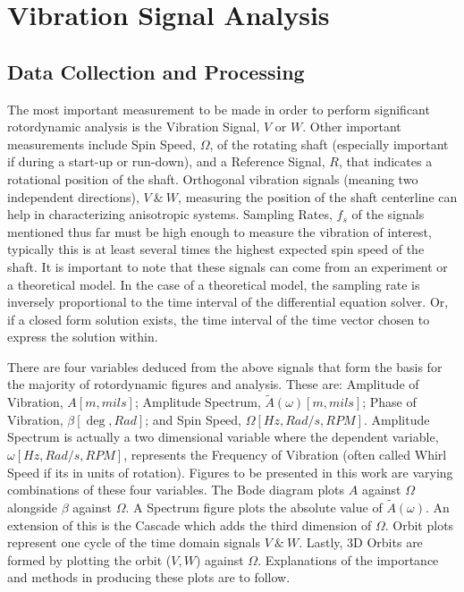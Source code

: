 \chapter{Vibration Signal Analysis}\label{VibrationSignalAnalysis}
\section{Data Collection and Processing}
The most important measurement to be made in order to perform significant rotordynamic analysis is the Vibration Signal, $ V $ or $ W $. Other important measurements include Spin Speed, $ \Omega $, of the rotating shaft (especially important if during a start-up or run-down), and a Reference Signal, $ R $, that indicates a rotational position of the shaft. Orthogonal vibration signals (meaning two independent directions), $ V\ \&\ W $, measuring the position of the shaft centerline can help in characterizing anisotropic systems. Sampling Rates, $ f_s $ of the signals mentioned thus far must be high enough to measure the vibration of interest, typically this is at least several times the highest expected spin speed of the shaft. It is important to note that these signals can come from an experiment or a theoretical model. In the case of a theoretical model, the sampling rate is inversely proportional to the time interval of the differential equation solver. Or, if a closed form solution exists, the time interval of the time vector chosen to express the solution within.\par
There are four variables deduced from the above signals that form the basis for the majority of rotordynamic figures and analysis. These are: Amplitude of Vibration, $ A[m,mils] $; Amplitude Spectrum, $ \tilde{A}(\omega)[m,mils] $; Phase of Vibration, $ \beta[\deg,Rad] $; and Spin Speed, $ \Omega[Hz,Rad/s,RPM] $. Amplitude Spectrum is actually a two dimensional variable where the dependent variable, $ \omega[Hz,Rad/s,RPM] $, represents the Frequency of Vibration (often called Whirl Speed if its in units of rotation). Figures to be presented in this work are varying combinations of these four variables. The Bode diagram plots $ A $ against $ \Omega $ alongside $ \beta $  against $ \Omega $. A Spectrum figure plots the absolute value of $ \tilde{A}(\omega) $. An extension of this is the Cascade which adds the third dimension of $ \Omega $. Orbit plots represent one cycle of the time domain signals $ V\ \&\ W $. Lastly, 3D Orbits are formed by plotting the orbit ($ V,W $) against $ \Omega $. Explanations of the importance and methods in producing these plots are to follow. \par
